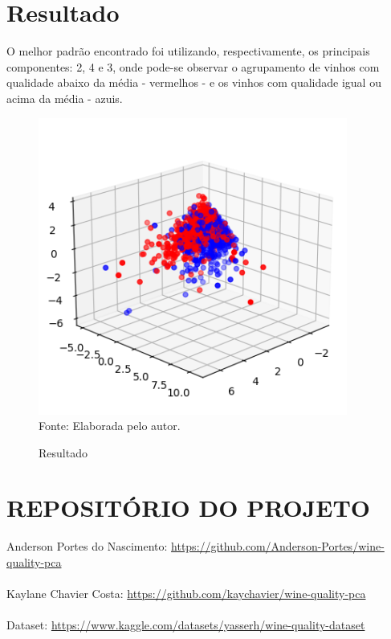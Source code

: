 \documentclass[a4paper, 12pt]{article}
\begin{document}
\newpage

\section{Resultado}
O melhor padrão encontrado foi utilizando, respectivamente, os principais componentes: 2, 4 e 3, onde pode-se observar o agrupamento de vinhos com qualidade abaixo da média - vermelhos - e os vinhos com qualidade igual ou acima da  média - azuis.
\begin{figure}[!ht]
        \centering
        \caption{Resultado}
        \includegraphics[scale=0.5]{grafico.png} \\
        {\footnotesize Fonte: Elaborada pelo autor.}
        \label{fig:my_label}
    \end{figure}


\newpage

\section{REPOSITÓRIO DO PROJETO}
Anderson Portes do Nascimento:
    \url{https://github.com/Anderson-Portes/wine-quality-pca}
\\\\Kaylane Chavier Costa:
    \url{https://github.com/kaychavier/wine-quality-pca}
\\\\Dataset:
\url{https://www.kaggle.com/datasets/yasserh/wine-quality-dataset}
\end{document}
